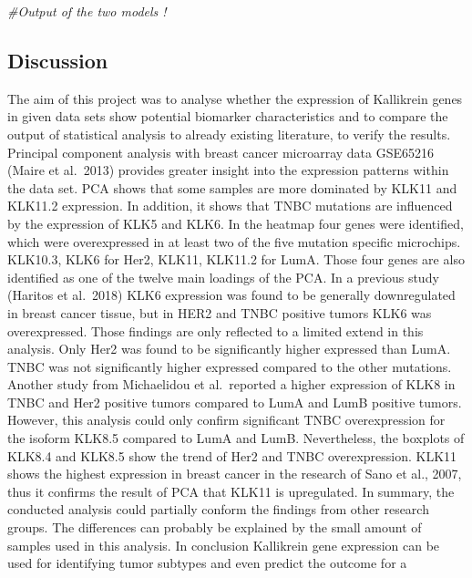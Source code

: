 \documentclass[
]{article}
\newenvironment{Shaded}{\begin{snugshade}}{\end{snugshade}}
\newcommand{\CommentTok}[1]{\textcolor[rgb]{0.56,0.35,0.01}{\textit{#1}}}
\begin{document}
\begin{Shaded}
\begin{Highlighting}[]
\CommentTok{#Output of the two models !}
\end{Highlighting}
\end{Shaded}

\hypertarget{discussion}{%
\subsection{Discussion}\label{discussion}}

The aim of this project was to analyse whether the expression of
Kallikrein genes in given data sets show potential biomarker
characteristics and to compare the output of statistical analysis to
already existing literature, to verify the results. Principal component
analysis with breast cancer microarray data GSE65216 (Maire et al.~2013)
provides greater insight into the expression patterns within the data
set. PCA shows that some samples are more dominated by KLK11 and KLK11.2
expression. In addition, it shows that TNBC mutations are influenced by
the expression of KLK5 and KLK6. In the heatmap four genes were
identified, which were overexpressed in at least two of the five
mutation specific microchips. KLK10.3, KLK6 for Her2, KLK11, KLK11.2 for
LumA. Those four genes are also identified as one of the twelve main
loadings of the PCA. In a previous study (Haritos et al.~2018) KLK6
expression was found to be generally downregulated in breast cancer
tissue, but in HER2 and TNBC positive tumors KLK6 was overexpressed.
Those findings are only reflected to a limited extend in this analysis.
Only Her2 was found to be significantly higher expressed than LumA. TNBC
was not significantly higher expressed compared to the other mutations.
Another study from Michaelidou et al.~reported a higher expression of
KLK8 in TNBC and Her2 positive tumors compared to LumA and LumB positive
tumors. However, this analysis could only confirm significant TNBC
overexpression for the isoform KLK8.5 compared to LumA and LumB.
Nevertheless, the boxplots of KLK8.4 and KLK8.5 show the trend of Her2
and TNBC overexpression. KLK11 shows the highest expression in breast
cancer in the research of Sano et al., 2007, thus it confirms the result
of PCA that KLK11 is upregulated. In summary, the conducted analysis
could partially conform the findings from other research groups. The
differences can probably be explained by the small amount of samples
used in this analysis. In conclusion Kallikrein gene expression can be
used for identifying tumor subtypes and even predict the outcome for a
\end{document}
